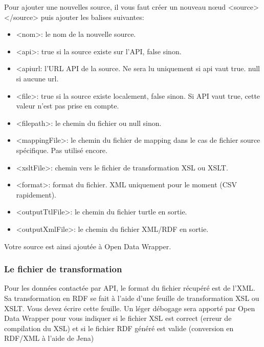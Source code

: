 \documentclass[a4paper]{article}
\begin{document}
Pour ajouter une nouvelles source, il vous faut créer un nouveau n\oe{}ud
<source></source> puis ajouter les balises suivantes:
\\

\begin{itemize}
  \item{<nom>}: le nom de la nouvelle source.
  \item{<api>}: true si la source existe sur l'API, false sinon.
  \item{<apiurl}: l'URL API de la source. Ne sera lu uniquement si api vaut
  true. null si aucune url.
  \item{<file>}: true si la source existe localement, false sinon. Si API vaut
  true, cette valeur n'est pas prise en compte.
  \item{<filepath>}: le chemin du fichier ou null sinon.
  \item{<mappingFile>}: le chemin du fichier de mapping dans le cas de fichier
  source spécifique. Pas utilisé encore.
  \item{<xsltFile>}: chemin vers le fichier de transformation XSL ou XSLT.
  \item{<format>}: format du fichier. XML uniquement pour le moment (CSV
  rapidement).
  \item{<outputTtlFile>}: le chemin du fichier turtle en sortie.
  \item{<outputXmlFile>}: le chemin du fichier XML/RDF en sortie.
\end{itemize}

Votre source est ainsi ajoutée à Open Data Wrapper.

\subsubsection{Le fichier de transformation}

Pour les données contactée par API, le format du fichier récupéré est de l'XML.
Sa transformation en RDF se fait à l'aide d'une feuille de transformation XSL ou
XSLT. Vous devez écrire cette feuille. Un léger débogage sera apporté par Open
Data Wrapper pour vous indiquer si le fichier XSL est correct (erreur de
compilation du XSL) et si le fichier RDF généré est valide (conversion en
RDF/XML à l'aide de Jena)
\end{document}
